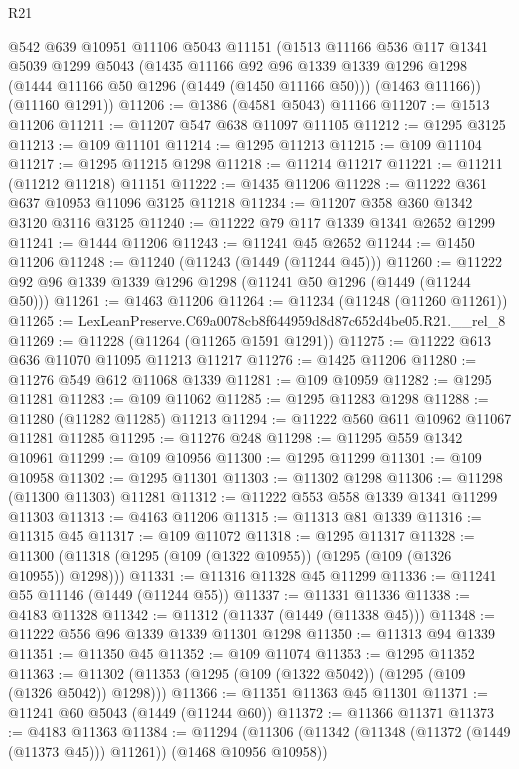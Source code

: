 \begin{lexlean}{R21}
\begin{coremodule}
    @542
    @639
    @10951
    @11106
    @5043
    @11151
    (@1513
      @11166
      @536
      @117
      @1341
      @5039
      @1299
      @5043
      (@1435
        @11166
        @92
        @96
        @1339
        @1339
        @1296
        @1298
        (@1444 @11166 @50 @1296 (@1449 (@1450 @11166 @50)))
        (@1463 @11166))
      (@11160 @1291))
@11206 := @1386 (@4581 @5043) @11166
@11207 := @1513 @11206
@11211 := @11207 @547 @638 @11097 @11105
@11212 := @1295 @3125
@11213 := @109 @11101
@11214 := @1295 @11213
@11215 := @109 @11104
@11217 := @1295 @11215 @1298
@11218 := @11214 @11217
@11221 := @11211 (@11212 @11218) @11151
@11222 := @1435 @11206
@11228 := @11222 @361 @637 @10953 @11096 @3125 @11218
@11234 := @11207 @358 @360 @1342 @3120 @3116 @3125
@11240 := @11222 @79 @117 @1339 @1341 @2652 @1299
@11241 := @1444 @11206
@11243 := @11241 @45 @2652
@11244 := @1450 @11206
@11248 := @11240 (@11243 (@1449 (@11244 @45)))
@11260 := @11222 @92 @96 @1339 @1339 @1296 @1298 (@11241 @50 @1296 (@1449 (@11244 @50)))
@11261 := @1463 @11206
@11264 := @11234 (@11248 (@11260 @11261))
@11265 := LexLeanPreserve.C69a0078cb8f644959d8d87c652d4be05.R21.__rel_8
@11269 := @11228 (@11264 (@11265 @1591 @1291))
@11275 := @11222 @613 @636 @11070 @11095 @11213 @11217
@11276 := @1425 @11206
@11280 := @11276 @549 @612 @11068 @1339
@11281 := @109 @10959
@11282 := @1295 @11281
@11283 := @109 @11062
@11285 := @1295 @11283 @1298
@11288 := @11280 (@11282 @11285) @11213
@11294 := @11222 @560 @611 @10962 @11067 @11281 @11285
@11295 := @11276 @248
@11298 := @11295 @559 @1342 @10961
@11299 := @109 @10956
@11300 := @1295 @11299
@11301 := @109 @10958
@11302 := @1295 @11301
@11303 := @11302 @1298
@11306 := @11298 (@11300 @11303) @11281
@11312 := @11222 @553 @558 @1339 @1341 @11299 @11303
@11313 := @4163 @11206
@11315 := @11313 @81 @1339
@11316 := @11315 @45
@11317 := @109 @11072
@11318 := @1295 @11317
@11328 := @11300 (@11318 (@1295 (@109 (@1322 @10955)) (@1295 (@109 (@1326 @10955)) @1298)))
@11331 := @11316 @11328 @45 @11299
@11336 := @11241 @55 @11146 (@1449 (@11244 @55))
@11337 := @11331 @11336
@11338 := @4183 @11328
@11342 := @11312 (@11337 (@1449 (@11338 @45)))
@11348 := @11222 @556 @96 @1339 @1339 @11301 @1298
@11350 := @11313 @94 @1339
@11351 := @11350 @45
@11352 := @109 @11074
@11353 := @1295 @11352
@11363 := @11302 (@11353 (@1295 (@109 (@1322 @5042)) (@1295 (@109 (@1326 @5042)) @1298)))
@11366 := @11351 @11363 @45 @11301
@11371 := @11241 @60 @5043 (@1449 (@11244 @60))
@11372 := @11366 @11371
@11373 := @4183 @11363
@11384 := @11294
    (@11306 (@11342 (@11348 (@11372 (@1449 (@11373 @45))) @11261)) (@1468 @10956 @10958))

\end{coremodule}
\end{lexlean}

